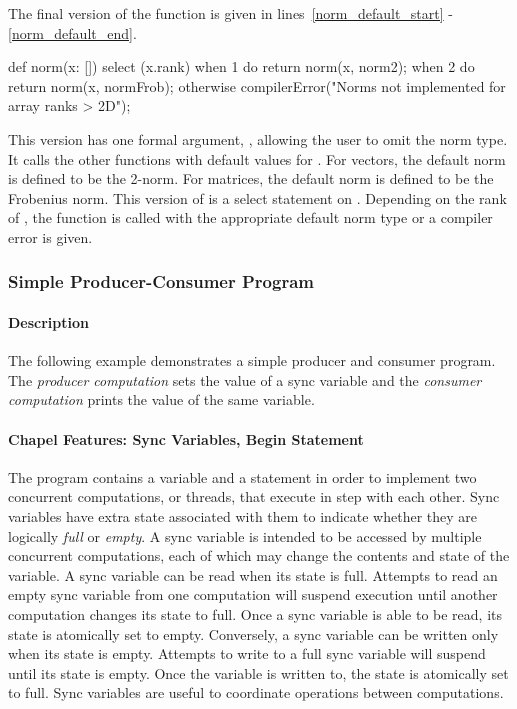 The final version of the  function is given in 
lines~\ref{norm_default_start} - \ref{norm_default_end}.
\begin{chapel}
  def norm(x: []) { 
    select (x.rank) { 
      when 1 do return norm(x, norm2);  
      when 2 do return norm(x, normFrob); 
      otherwise compilerError("Norms not implemented for array ranks > 2D"); 
    }   
  }  
\end{chapel}
This version has one formal argument, , allowing the user to 
omit the norm type.  It calls the other  functions with default values for 
.  For vectors, the default norm is defined to be the 2-norm.
For matrices, the default norm is defined to be the Frobenius norm.  This 
version of  is a select statement on .  Depending
on the rank of , the  function is called with the
appropriate default norm type or a compiler error is given.

\subsubsection{Simple Producer-Consumer Program}
\paragraph{Description}
The following example demonstrates a simple producer and consumer program.
The {\em producer computation} sets the value of a sync variable and the 
{\em consumer computation} prints the value of the same variable.

\paragraph{Chapel Features:  Sync Variables, Begin Statement}
The program contains a  variable and a  statement 
in order to implement two concurrent computations, or threads, that execute 
in step with each other.
Sync variables have extra state associated with them to
indicate whether they are logically {\em full} or {\em empty}.  
A sync variable
is intended to be accessed by multiple concurrent computations, each of which may
change the contents and state of the variable.  A sync variable
can be read when its state is full.  Attempts to read an empty sync variable from one
computation will suspend execution until another computation changes its state to full.
Once a sync variable is able to be read, its state is atomically set to empty.
Conversely, a sync variable can be written only when its state is empty.  Attempts
to write to a full sync variable will suspend until its state is empty.  Once the variable
is written to, the state is atomically set to full.  Sync variables are useful
to coordinate operations between computations.

